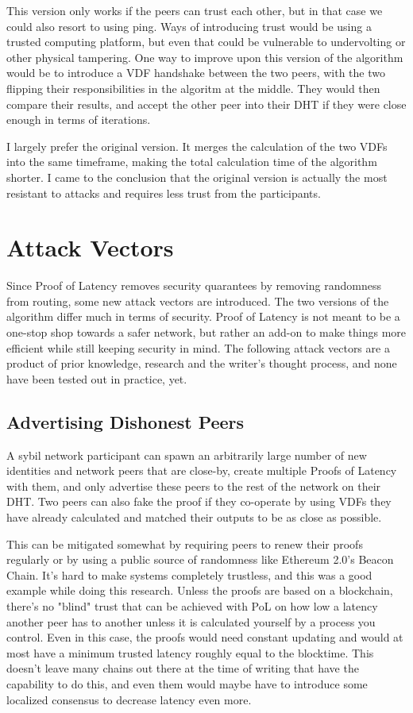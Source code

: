 This version only works if the peers can trust each other, but in that case we could also resort to using ping. Ways of introducing trust would be using a trusted computing platform, but even that could be vulnerable to undervolting or other physical tampering. One way to improve upon this version of the algorithm would be to introduce a VDF handshake between the two peers, with the two flipping their responsibilities in the algoritm at the middle. They would then compare their results, and accept the other peer into their DHT if they were close enough in terms of iterations.

I largely prefer the original version. It merges the calculation of the two VDFs into the same timeframe, making the total calculation time of the algorithm shorter. I came to the conclusion that the original version is actually the most resistant to attacks and requires less trust from the participants.

\section{Attack Vectors}
Since Proof of Latency removes security quarantees by removing randomness from routing, some new attack vectors are introduced. The two versions of the algorithm differ much in terms of security. Proof of Latency is not meant to be a one-stop shop towards a safer network, but rather an add-on to make things more efficient while still keeping security in mind. The following attack vectors are a product of prior knowledge, research and the writer's thought process, and none have been tested out in practice, yet.

\subsection{Advertising Dishonest Peers}
A sybil network participant can spawn an arbitrarily large number of new identities and network peers that are close-by, create multiple Proofs of Latency with them, and only advertise these peers to the rest of the network on their DHT. Two peers can also fake the proof if they co-operate by using VDFs they have already calculated and matched their outputs to be as close as possible. 

This can be mitigated somewhat by requiring peers to renew their proofs regularly or by using a public source of randomness like Ethereum 2.0's Beacon Chain. It's hard to make systems completely trustless, and this was a good example while doing this research. Unless the proofs are based on a blockchain, there's no "blind" trust that can be achieved with PoL on how low a latency another peer has to another unless it is calculated yourself by a process you control. Even in this case, the proofs would need constant updating and would at most have a minimum trusted latency roughly equal to the blocktime. This doesn't leave many chains out there at the time of writing that have the capability to do this, and even them would maybe have to introduce some localized consensus to decrease latency even more.

